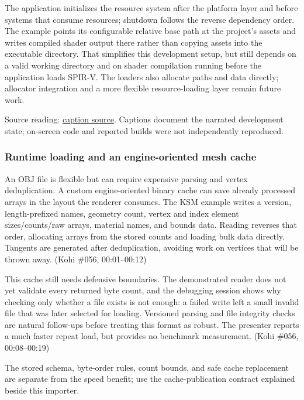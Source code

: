 The application initializes the resource system after the platform layer and before systems that consume resources; shutdown follows the reverse dependency order. The example points its configurable relative base path at the project's assets and writes compiled shader output there rather than copying assets into the executable directory. That simplifies this development setup, but still depends on a valid working directory and on shader compilation running before the application loads SPIR-V. The loaders also allocate paths and data directly; allocator integration and a more flexible resource-loading layer remain future work.

Source reading: \href{https://www.youtube.com/watch?v=ubin1HH_kqw}{caption source}. Captions document the narrated development state; on-screen code and reported builds were not independently reproduced.

\subsubsection{Runtime loading and an engine-oriented mesh cache}\label{06-engine-ii-ch027-runtime-loading-and-an-engine-oriented-mesh-cache}

An OBJ file is flexible but can require expensive parsing and vertex deduplication. A custom engine-oriented binary cache can save already processed arrays in the layout the renderer consumes. The KSM example writes a version, length-prefixed names, geometry count, vertex and index element sizes/counts/raw arrays, material names, and bounds data. Reading reverses that order, allocating arrays from the stored counts and loading bulk data directly. Tangents are generated after deduplication, avoiding work on vertices that will be thrown away. (Kohi \#056, 00:01--00:12)

This cache still needs defensive boundaries. The demonstrated reader does not yet validate every returned byte count, and the debugging session shows why checking only whether a file exists is not enough: a failed write left a small invalid file that was later selected for loading. Versioned parsing and file integrity checks are natural follow-ups before treating this format as robust. The presenter reports a much faster repeat load, but provides no benchmark measurement. (Kohi \#056, 00:08--00:19)

The stored schema, byte-order rules, count bounds, and safe cache replacement are separate from the speed benefit; use the cache-publication contract explained beside this importer.


